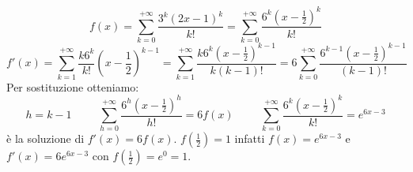 \begin{example}
     \begin{equation*}f(x)=\sum^{+\infty}_{k=0}\frac{3^k(2x-1)^k}{k!}=\sum^{+\infty}_{k=0}\frac{6^k(x-\frac{1}{2})^k}{k!}\end{equation*}
     \begin{equation*}
         f'(x)=\sum^{+\infty}_{k=1}\frac{k6^k}{k!}(x-\frac{1}{2})^{k-1}=\sum^{+\infty}_{k=1}\frac{k6^k(x-\frac{1}{2})^{k-1}}{k(k-1)!}=6\sum^{+\infty}_{k=0}\frac{6^{k-1}(x-\frac{1}{2})^{k-1}}{(k-1)!}
     \end{equation*}
     Per sostituzione otteniamo:
     \begin{equation*}
         h=k-1\hspace{1cm}\sum^{+\infty}_{h=0}\frac{6^h(x-\frac{1}{2})^h}{h!}=6f(x)\hspace{1cm}\sum^{+\infty}_{k=0}\frac{6^k(x-\frac{1}{2})^k}{k!}=e^{6x-3}
     \end{equation*}
     è la soluzione di $f'(x)=6f(x)$. $f(\frac{1}{2})=1$ infatti $f(x)=e^{6x-3}$ e $f'(x)=6e^{6x-3}$ con $f(\frac{1}{2})=e^0=1$.
     
\end{example}




\newpage
